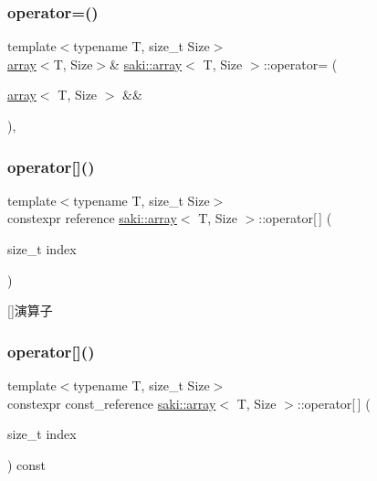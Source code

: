 \subsubsection{\texorpdfstring{operator=()}{operator=()}\hspace{0.1cm}{\footnotesize\ttfamily [2/2]}}
{\footnotesize\ttfamily template$<$typename T, size\+\_\+t Size$>$ \\
\mbox{\hyperlink{classsaki_1_1array}{array}}$<$T, Size$>$\& \mbox{\hyperlink{classsaki_1_1array}{saki\+::array}}$<$ T, Size $>$\+::operator= (\begin{DoxyParamCaption}\item[{\mbox{\hyperlink{classsaki_1_1array}{array}}$<$ T, Size $>$ \&\&}]{ }\end{DoxyParamCaption})\hspace{0.3cm}{\ttfamily [default]}, {\ttfamily [noexcept]}}

\mbox{\label{classsaki_1_1array_a80d710f65364ea966da0287bea34105d}} 
\subsubsection{\texorpdfstring{operator[]()}{operator[]()}\hspace{0.1cm}{\footnotesize\ttfamily [1/2]}}
{\footnotesize\ttfamily template$<$typename T, size\+\_\+t Size$>$ \\
constexpr reference \mbox{\hyperlink{classsaki_1_1array}{saki\+::array}}$<$ T, Size $>$\+::operator\mbox{[}$\,$\mbox{]} (\begin{DoxyParamCaption}\item[{size\+\_\+t}]{index }\end{DoxyParamCaption})\hspace{0.3cm}{\ttfamily [inline]}}



\mbox{[}\mbox{]}演算子 

\mbox{\label{classsaki_1_1array_ae2abbcbe091f9c1634c701bf2257f6a5}} 
\subsubsection{\texorpdfstring{operator[]()}{operator[]()}\hspace{0.1cm}{\footnotesize\ttfamily [2/2]}}
{\footnotesize\ttfamily template$<$typename T, size\+\_\+t Size$>$ \\
constexpr const\+\_\+reference \mbox{\hyperlink{classsaki_1_1array}{saki\+::array}}$<$ T, Size $>$\+::operator\mbox{[}$\,$\mbox{]} (\begin{DoxyParamCaption}\item[{size\+\_\+t}]{index }\end{DoxyParamCaption}) const\hspace{0.3cm}{\ttfamily [inline]}}



